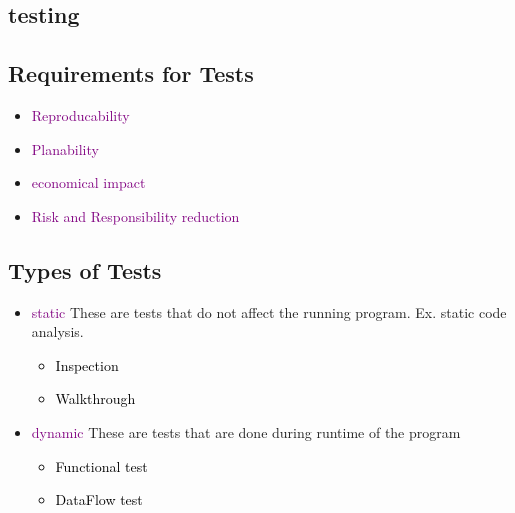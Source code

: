 \documentclass[main.tex,fontsize=12pt,paper=a4,paper=landscape,DIV=calc,]{scrartcl}
\begin{document}
\begin{multicols*}{2}
\section{testing}

\subsection{Requirements for Tests}
\begin{itemize}
\item \textcolor{purple}{Reproducability}
\item \textcolor{purple}{Planability}
\item \textcolor{purple}{economical impact}
\item \textcolor{purple}{Risk and Responsibility reduction}
\end{itemize} 

\subsection{Types of Tests}
\begin{itemize}
\item \textcolor{purple}{static}\newline
  These are tests that do not affect the running program.\newline
  Ex. static code analysis.\newline
  \begin{itemize}
  \item \textcolor{black}{Inspection}
  \item \textcolor{black}{Walkthrough}
  \end{itemize} 
\item \textcolor{purple}{dynamic}\newline
  These are tests that are done during runtime of the program\newline
  \begin{itemize}
  \item \textcolor{black}{Functional test}
  \item \textcolor{black}{DataFlow test}
  \end{itemize} 
\end{itemize} 


\end{multicols*}
\end{document}
